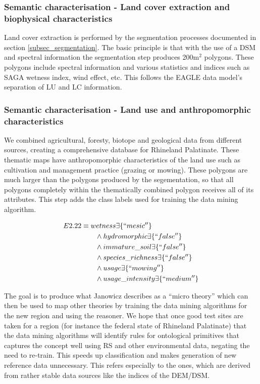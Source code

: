 \documentclass[authoryear, review,12pt,number]{elsarticle}
\begin{document}
\subsubsection{Semantic characterisation - Land cover extraction and biophysical
characteristics} Land cover extraction is performed by the segmentation processes documented in  
section \ref{subsec_segmentation}. The basic principle is that with the use of 
a DSM and spectral information the segmentation step produces 200m$^{2}$ 
polygons. These polygons include spectral information and various statistics 
and indices such as SAGA wetness index, wind effect, etc.   
This follows the EAGLE data model's separation of LU and LC information.

\subsubsection{Semantic characterisation - Land use and anthropomorphic
characteristics} We combined agricultural, foresty, biotope and geological data from different 
sources, creating a comprehensive database for Rhineland Palatinate. These 
thematic maps have anthropomorphic characteristics of the land use such as 
cultivation and management practice (grazing or mowing). These polygons are 
much larger than the polygons produced by the segementation, so that all 
polygons completely within the thematically combined polygon receives all of 
its attributes. This step adds the class labels used for training the data 
mining algorithm. 

\begin{equation}
\begin{align*}
E2.22 &\equiv wetness \exists \{``mesic''\} \\
&\qquad {} \land hydromorphic \exists \{``false''\} \\
&\qquad {} \land immature\_soil \exists \{``false''\} \\
&\qquad {} \land species\_richness \exists \{``false''\} \\
&\qquad {} \land usage \exists \{``mowing''\} \\
&\qquad {} \land usage\_intensity \exists \{``medium''\} \\
\end{align*}
\label{eq:description_logic}
\end{equation}


The goal is to produce what Janowicz describes as a
``micro theory'' \citep{Janowicz2012} which can then be used to map other theories
by training the data mining algorithms for the new region and using the
reasoner. We hope that once good test sites are taken for a region (for instance
the federal state of Rhineland Palatinate) that the data mining algorithms will
identify rules for ontological primitives that captures the concept well using
RS and other environmental data, negating the need to re-train. This speeds
up classification and makes generation of new reference data unnecessary. This
refers especially to the ones, which are derived from rather stable data sources
like the indices of the DEM/DSM.
\end{document}
